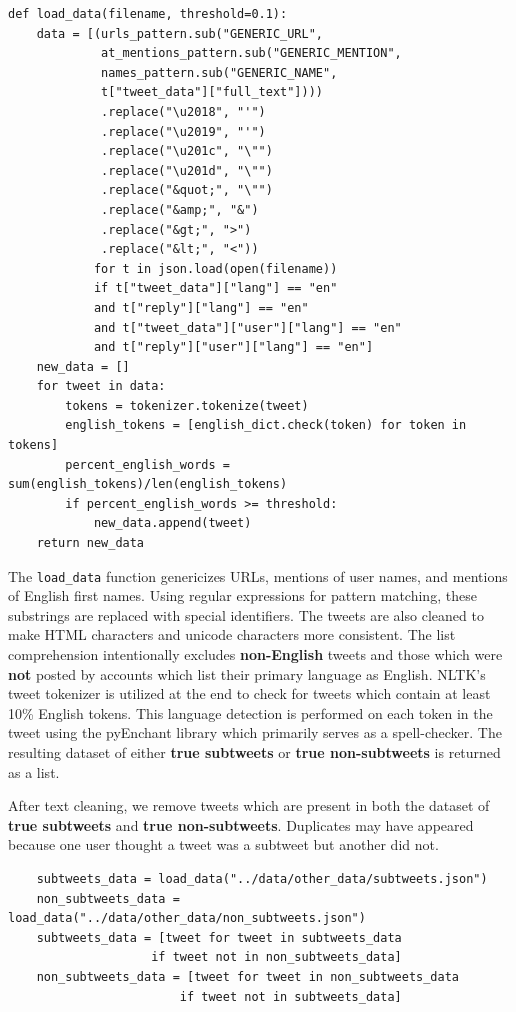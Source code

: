 \documentclass[11pt, twoside, reqno]{book}
\begin{document}
\begin{verbatim}
def load_data(filename, threshold=0.1):
    data = [(urls_pattern.sub("GENERIC_URL",
             at_mentions_pattern.sub("GENERIC_MENTION",
             names_pattern.sub("GENERIC_NAME",
             t["tweet_data"]["full_text"])))
             .replace("\u2018", "'")
             .replace("\u2019", "'")
             .replace("\u201c", "\"")
             .replace("\u201d", "\"")
             .replace("&quot;", "\"")
             .replace("&amp;", "&")
             .replace("&gt;", ">")
             .replace("&lt;", "<"))
            for t in json.load(open(filename))
            if t["tweet_data"]["lang"] == "en"
            and t["reply"]["lang"] == "en"
            and t["tweet_data"]["user"]["lang"] == "en"
            and t["reply"]["user"]["lang"] == "en"]
    new_data = []
    for tweet in data:
        tokens = tokenizer.tokenize(tweet)
        english_tokens = [english_dict.check(token) for token in tokens]
        percent_english_words = sum(english_tokens)/len(english_tokens)
        if percent_english_words >= threshold:
            new_data.append(tweet)
    return new_data
\end{verbatim}
\noindent
The \verb|load_data| function genericizes URLs, mentions of user names, and mentions of English first names. Using regular expressions for pattern matching, these substrings are replaced with special identifiers. The tweets are also cleaned to make HTML characters and unicode characters more consistent. The list comprehension intentionally excludes \textbf{non-English} tweets and those which were \textbf{not} posted by accounts which list their primary language as English. NLTK's tweet tokenizer is utilized at the end to check for tweets which contain at least 10\% English tokens. This language detection is performed on each token in the tweet using the pyEnchant library \cite{pyenchant} which primarily serves as a spell-checker. The resulting dataset of either \textbf{true subtweets} or \textbf{true non-subtweets} is returned as a list.

After text cleaning, we remove tweets which are present in both the dataset of \textbf{true subtweets} and \textbf{true non-subtweets}. Duplicates may have appeared because one user thought a tweet was a subtweet but another did not.

\begin{verbatim}
	subtweets_data = load_data("../data/other_data/subtweets.json")
	non_subtweets_data = load_data("../data/other_data/non_subtweets.json")
	subtweets_data = [tweet for tweet in subtweets_data 
                    if tweet not in non_subtweets_data]
	non_subtweets_data = [tweet for tweet in non_subtweets_data 
                        if tweet not in subtweets_data]
\end{verbatim}
\end{document}
